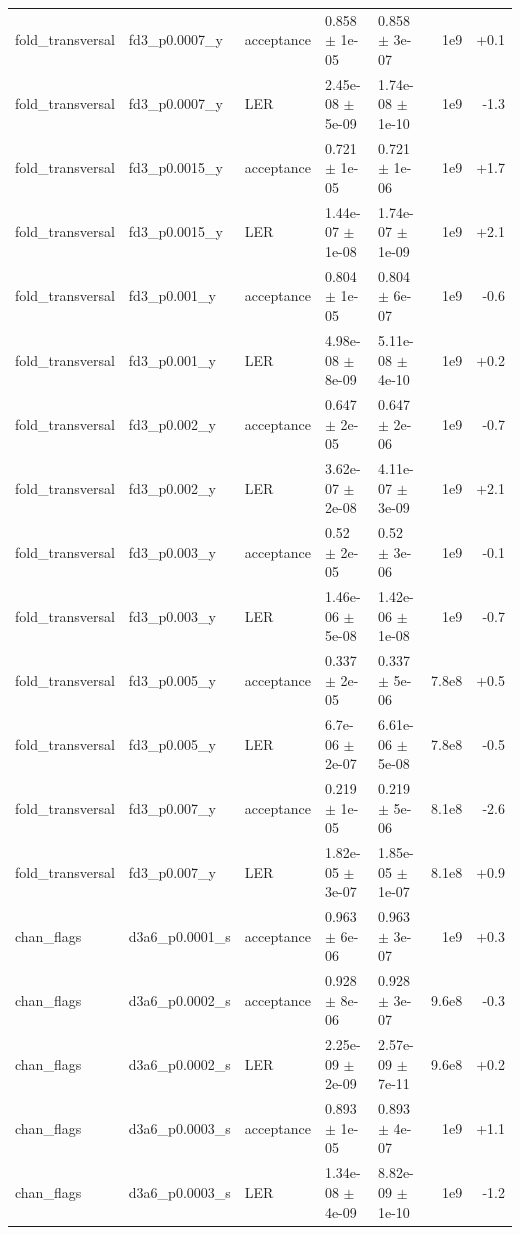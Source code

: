 \documentclass[10pt]{article}
\begin{document}
{\begin{longtable}{l l l l l r r}
fold\_transversal & fd3\_p0.0007\_y & acceptance & 0.858 $\pm$ 1e-05 & 0.858 $\pm$ 3e-07 & 1e9 & +0.1 \\
fold\_transversal & fd3\_p0.0007\_y & LER & 2.45e-08 $\pm$ 5e-09 & 1.74e-08 $\pm$ 1e-10 & 1e9 & -1.3 \\
fold\_transversal & fd3\_p0.0015\_y & acceptance & 0.721 $\pm$ 1e-05 & 0.721 $\pm$ 1e-06 & 1e9 & +1.7 \\
fold\_transversal & fd3\_p0.0015\_y & LER & 1.44e-07 $\pm$ 1e-08 & 1.74e-07 $\pm$ 1e-09 & 1e9 & +2.1 \\
fold\_transversal & fd3\_p0.001\_y & acceptance & 0.804 $\pm$ 1e-05 & 0.804 $\pm$ 6e-07 & 1e9 & -0.6 \\
fold\_transversal & fd3\_p0.001\_y & LER & 4.98e-08 $\pm$ 8e-09 & 5.11e-08 $\pm$ 4e-10 & 1e9 & +0.2 \\
fold\_transversal & fd3\_p0.002\_y & acceptance & 0.647 $\pm$ 2e-05 & 0.647 $\pm$ 2e-06 & 1e9 & -0.7 \\
fold\_transversal & fd3\_p0.002\_y & LER & 3.62e-07 $\pm$ 2e-08 & 4.11e-07 $\pm$ 3e-09 & 1e9 & +2.1 \\
fold\_transversal & fd3\_p0.003\_y & acceptance & 0.52 $\pm$ 2e-05 & 0.52 $\pm$ 3e-06 & 1e9 & -0.1 \\
fold\_transversal & fd3\_p0.003\_y & LER & 1.46e-06 $\pm$ 5e-08 & 1.42e-06 $\pm$ 1e-08 & 1e9 & -0.7 \\
fold\_transversal & fd3\_p0.005\_y & acceptance & 0.337 $\pm$ 2e-05 & 0.337 $\pm$ 5e-06 & 7.8e8 & +0.5 \\
fold\_transversal & fd3\_p0.005\_y & LER & 6.7e-06 $\pm$ 2e-07 & 6.61e-06 $\pm$ 5e-08 & 7.8e8 & -0.5 \\
fold\_transversal & fd3\_p0.007\_y & acceptance & 0.219 $\pm$ 1e-05 & 0.219 $\pm$ 5e-06 & 8.1e8 & -2.6 \\
fold\_transversal & fd3\_p0.007\_y & LER & 1.82e-05 $\pm$ 3e-07 & 1.85e-05 $\pm$ 1e-07 & 8.1e8 & +0.9 \\
chan\_flags & d3a6\_p0.0001\_s & acceptance & 0.963 $\pm$ 6e-06 & 0.963 $\pm$ 3e-07 & 1e9 & +0.3 \\
chan\_flags & d3a6\_p0.0002\_s & acceptance & 0.928 $\pm$ 8e-06 & 0.928 $\pm$ 3e-07 & 9.6e8 & -0.3 \\
chan\_flags & d3a6\_p0.0002\_s & LER & 2.25e-09 $\pm$ 2e-09 & 2.57e-09 $\pm$ 7e-11 & 9.6e8 & +0.2 \\
chan\_flags & d3a6\_p0.0003\_s & acceptance & 0.893 $\pm$ 1e-05 & 0.893 $\pm$ 4e-07 & 1e9 & +1.1 \\
chan\_flags & d3a6\_p0.0003\_s & LER & 1.34e-08 $\pm$ 4e-09 & 8.82e-09 $\pm$ 1e-10 & 1e9 & -1.2 \\

\end{longtable}}
\end{document}

